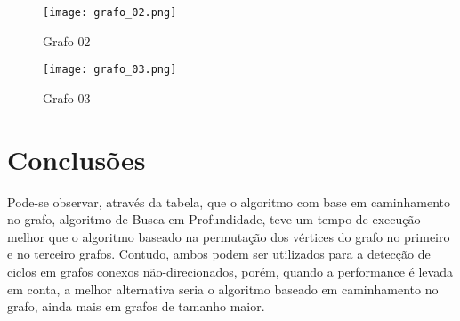 \documentclass[12pt]{article}
\begin{document}
\begin{figure}[htbp]
  \centering
  \texttt{[image: grafo\_02.png]}
  \caption{Grafo 02}
  \label{fig:sua-imagem}
\end{figure}

\begin{figure}[htbp]
  \centering
  \texttt{[image: grafo\_03.png]}
  \caption{Grafo 03}
  \label{fig:sua-imagem}
\end{figure}

\section{Conclusões}

Pode-se observar, através da tabela, que o algoritmo com base em caminhamento no grafo, algoritmo de Busca em Profundidade, teve um tempo de execução melhor que o algoritmo baseado na permutação dos vértices do grafo no primeiro e no terceiro grafos. Contudo, ambos podem ser utilizados para a detecção de ciclos em grafos conexos não-direcionados, porém, quando a performance é levada em conta, a melhor alternativa seria o algoritmo baseado em caminhamento no grafo, ainda mais em grafos de tamanho maior.


\end{document}
